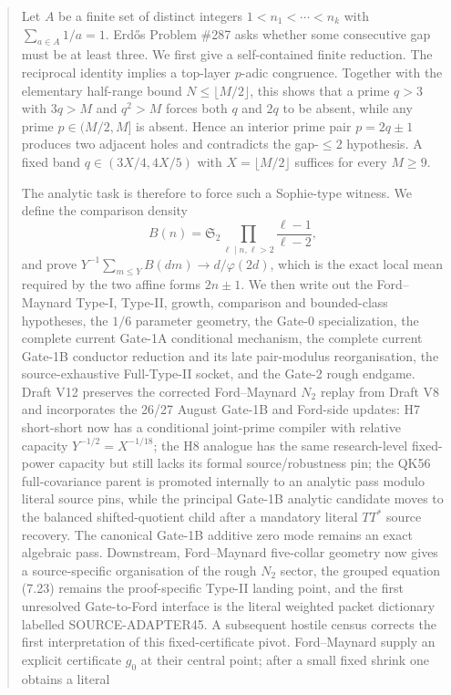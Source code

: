 \documentclass[11pt]{article}
\theoremstyle{definition}
\theoremstyle{remark}
\newcommand{\1}{\mathbf 1}
\begin{document}
\begin{abstract}
Let $A$ be a finite set of distinct integers $1<n_1<\cdots<n_k$ with
$\sum_{a\in A}1/a=1$.  Erd\H{o}s Problem \#287 asks whether some consecutive gap must be at least three.
We first give a self-contained finite reduction.  The reciprocal identity implies a top-layer $p$-adic
congruence.  Together with the elementary half-range bound $N\le\lfloor M/2\rfloor$, this shows that a prime
$q>3$ with $3q>M$ and $q^2>M$ forces both $q$ and $2q$ to be absent, while any prime $p\in(M/2,M]$ is absent.
Hence an interior prime pair $p=2q\pm1$ produces two adjacent holes and contradicts the gap-$\le2$ hypothesis.
A fixed band $q\in(3X/4,4X/5)$ with $X=\lfloor M/2\rfloor$ suffices for every $M\ge9$.

The analytic task is therefore to force such a Sophie-type witness.  We define the comparison density
\[
 B(n)=\mathfrak S_2\prod_{\ell\mid n,\ell>2}\frac{\ell-1}{\ell-2},
\]
and prove $Y^{-1}\sum_{m\le Y}B(dm)\to d/\varphi(2d)$, which is the exact local mean required by the two
affine forms $2n\pm1$.  We then write out the Ford--Maynard Type-I, Type-II, growth, comparison and bounded-class hypotheses,
the $1/6$ parameter geometry, the Gate-0 specialization, the complete current Gate-1A conditional mechanism,
the complete current Gate-1B conductor reduction and its late pair-modulus reorganisation, the source-exhaustive
Full-Type-II socket, and the Gate-2 rough endgame.  Draft V12 preserves the corrected Ford--Maynard $N_2$ replay
from Draft V8 and incorporates the 26/27 August Gate-1B and Ford-side updates: H7 short-short now has a conditional joint-prime compiler
with relative capacity $Y^{-1/2}=X^{-1/18}$; the H8 analogue has the same research-level fixed-power capacity but
still lacks its formal source/robustness pin; the QK56 full-covariance parent is promoted internally to an analytic pass modulo literal source pins,
while the principal Gate-1B analytic candidate moves to the balanced shifted-quotient child after a mandatory
literal $TT^*$ source recovery.  The canonical Gate-1B additive zero mode remains an exact algebraic pass.
Downstream, Ford--Maynard five-collar geometry now gives a source-specific organisation of the rough $N_2$
sector, the grouped equation (7.23) remains the proof-specific Type-II landing point, and the first unresolved
Gate-to-Ford interface is the literal weighted packet dictionary labelled SOURCE-ADAPTER45.
A subsequent hostile census corrects the first interpretation of this fixed-certificate pivot.  Ford--Maynard
supply an explicit certificate $g_0$ at their central point; after a small fixed shrink one obtains a literal

\end{abstract}
\end{document}
